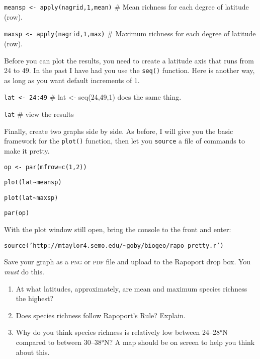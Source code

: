 \documentclass[11pt]{article}
\begin{document}
\texttt{meansp \textless{}- apply(nagrid,1,mean)} \quad \# Mean 
richness for each degree of latitude (row).

\texttt{maxsp \textless{}- apply(nagrid,1,max)} \qquad \# Maximum 
richness for each degree of latitude (row).

Before you can plot the results, you need to create a latitude axis 
that runs from 24 to 49. In the past I have had you use the 
\texttt{seq()} function. Here is another way, as long as you want 
default increments of 1.

\texttt{lat \textless{}- 24:49}  \qquad \# lat \textless{}- 
seq(24,49,1) does the same thing.

\texttt{lat} \qquad \# view the results

Finally, create two graphs side by side.
As before, I will give you the basic framework for the \texttt{plot()} 
function, then let you \texttt{source} a file of commands to make it 
pretty.

\texttt{op \textless{}- par(mfrow=c(1,2))} 

\texttt{plot(lat\textasciitilde{}meansp)}

\texttt{plot(lat\textasciitilde{}maxsp)}

\texttt{par(op)}

With the plot window still open, bring the console to the front and 
enter:

\texttt{source('http://mtaylor4.semo.edu/\textasciitilde{}goby/biogeo/rapo\_pretty.r')}

Save your graph as a \textsc{png} or \textsc{pdf} file and upload to 
the Rapoport drop box. You \emph{must} do this.

\begin{enumerate}
	\item At what latitudes, approximately, are mean and maximum 
	species richness the highest? 

	\vspace{5\baselineskip}

	\item Does species richness follow Rapoport's Rule? Explain.

	
	\newpage

	\item Why do you think species richness is relatively low between
	24–28°N compared to between 30–38°N? A map should be on screen to 
	help you think about this.

	\vspace{7\baselineskip}

\end{enumerate}
\end{document}
